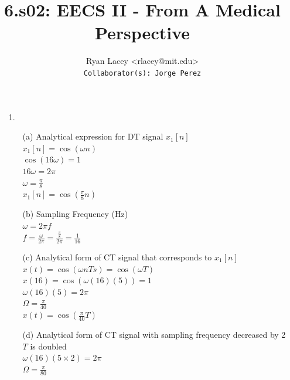 \documentclass{article}
\begin{document}

\title{6.s02: EECS II - From A Medical Perspective}
\author{
  Ryan Lacey <rlacey@mit.edu>\\
  \footnotesize \texttt{Collaborator(s): Jorge Perez}
}
        
\maketitle
        


\begin{enumerate}

\item[1.]
	\begin{enumerate}
	\item[(a)] 
		        Analytical expression for DT signal $x_1[n]$\\
		        
		        $x_1[n] = \cos{\left(\omega n\right)}$\\
		        
		        $\cos{\left(16\omega\right)} = 1$\\
		        $16\omega = 2\pi$\\
		        $\omega = \frac{\pi}{8}$\\
		        
		        $x_1[n] = \cos{\left( \frac{\pi}{8} n \right)}$
\bigskip
	\item[(b)] 
		        Sampling Frequency (Hz)\\
		        \newline
		        $\omega = 2\pi f$\\
		        $f = \frac{\omega}{2\pi} = \frac{\frac{\pi}{8}}{2\pi} = \frac{1}{16}$
\bigskip
	\item[(c)] 
		        Analytical form of CT signal that corresponds to $x_1[n]$\\
		        \newline
		        $x(t) = \cos{\left( \omega n T s \right)} = \cos{\left( \omega T \right)}$\\
		        
		        $x(16) = \cos{\left( \omega (16)(5) \right)} = 1$\\
		        $\omega (16)(5) = 2\pi$\\
		        $\Omega = \frac{\pi}{40}$\\
		        
		        $x(t) = \cos{\left( \frac{\pi}{40} T \right)}$
\bigskip
	\item[(d)] 
		        Analytical form of CT signal with sampling frequency decreased by 2\\
		        \newline
		        $T$ is doubled\\
		        $\omega (16)(5 \times 2) = 2\pi$\\
		        $\Omega = \frac{\pi}{80}$\\
		        

\end{enumerate}
\end{enumerate}
\end{document}
